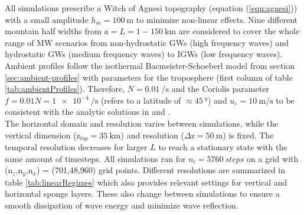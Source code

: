 All simulations prescribe a Witch of Agnesi topography (equation (\ref{equ:agnesi})) with a small amplitude $h_m = \SI{100}{\meter}$ to minimize non-linear effects. Nine different mountain half widths from $a = L = 1-\SI{150}{\kilo\meter}$ are considered to cover the whole range of MW scenarios from non-hydrostatic GWs (high frequency waves) and hydrostatic GWs (medium frequency waves) to IGWs (low frequency waves). Ambient profiles follow the isothermal Bacmeister-Schoeberl model from section \ref{sec:ambient-profiles} with parameters for the troposphere (first column of table \ref{tab:ambientProfiles}). Therefore, $N=\SI{0.01}{\per\second}$ and the Coriolis parameter $f = 0.01N = \SI{1e-4}{\per\second}$ (refers to a latitude of $\approx \SI{45}{\degree}$) and $u_e =\SI{10}{\meter\per\second}$ to be consistent with the analytic solutions in \textcite[]{queney_problem_1948} and \textcite[]{gill_atmosphere-ocean_1982}. \\
The horizontal domain and resolution varies between simulations, while the vertical dimension (z$_{top}=\SI{35}{\kilo\meter}$) and resolution ($\Delta$z$=\SI{50}{\meter}$) is fixed. The temporal resolution decreases for larger $L$ to reach a stationary state with the same amount of timesteps. All simulations ran for $n_t=\SI{5760}{steps}$ on a grid with (n$_z$,n$_y$,n$_x$) = (701,48,960) grid points. Different resolutions are summarized in table \ref{tab:linearRegimes} which also provides relevant settings for vertical and horizontal sponge layers. These also change between simulations to ensure a smooth dissipation of wave energy and minimize wave reflection. \\
%
